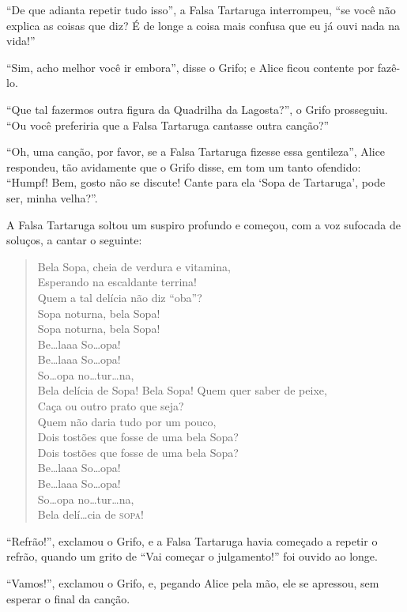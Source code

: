 ``De que adianta repetir tudo isso'', a Falsa Tartaruga interrompeu,
``se você não explica as coisas que diz? É de longe a coisa mais confusa
que eu já ouvi nada na vida!''

``Sim, acho melhor você ir embora'', disse o Grifo; e Alice ficou
contente por fazê-lo.

``Que tal fazermos outra figura da Quadrilha da Lagosta?'', o Grifo
prosseguiu. ``Ou você preferiria que a Falsa Tartaruga cantasse outra
canção?''

``Oh, uma canção, por favor, se a Falsa Tartaruga fizesse essa
gentileza'', Alice respondeu, tão avidamente que o Grifo disse, em tom
um tanto ofendido: ``Humpf! Bem, gosto não se discute! Cante para ela
`Sopa de Tartaruga', pode ser, minha velha?''.

A Falsa Tartaruga soltou um suspiro profundo e começou, com a voz
sufocada de soluços, a cantar o seguinte:

\begin{quote}
Bela Sopa, cheia de verdura e vitamina,\\
Esperando na escaldante terrina!\\
Quem a tal delícia não diz ``oba''?\\
Sopa noturna, bela Sopa!\\
Sopa noturna, bela Sopa!\\
Be\ldots{}laaa So\ldots{}opa!\\
Be\ldots{}laaa So\ldots{}opa!\\
So\ldots{}opa no\ldots{}tur\ldots{}na,\\
Bela delícia de Sopa!
\medskip
Bela Sopa! Quem quer saber de peixe,\\
Caça ou outro prato que seja?\\
Quem não daria tudo por um pouco,\\
Dois tostões que fosse de uma bela Sopa?\\
Dois tostões que fosse de uma bela Sopa?\\
Be\ldots{}laaa So\ldots{}opa!\\
Be\ldots{}laaa So\ldots{}opa!\\
So\ldots{}opa no\ldots{}tur\ldots{}na,\\
Bela delí\ldots{}cia de \textsc{sopa}!
\end{quote}

``Refrão!'', exclamou o Grifo, e a Falsa Tartaruga havia começado a
repetir o refrão, quando um grito de ``Vai começar o julgamento!'' foi
ouvido ao longe.

``Vamos!'', exclamou o Grifo, e, pegando Alice pela mão, ele se
apressou, sem esperar o final da canção.

